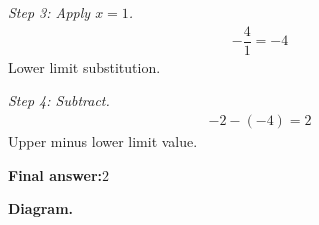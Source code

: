 \documentclass[11pt]{article}
\begin{document}
\textit{Step 3: Apply \( x = 1 \).}
\[\begin{gathered}
-\dfrac{4}{1} = -4
\end{gathered}\]
Lower limit substitution.

\textit{Step 4: Subtract.}
\[\begin{gathered}
-2 - (-4) = 2
\end{gathered}\]
Upper minus lower limit value.

\begin{answerbox}
\textbf{Final answer:}\quad \(\displaystyle 2\)
\end{answerbox}
\textbf{Diagram.}

\begin{center}
\end{center}
\end{document}
